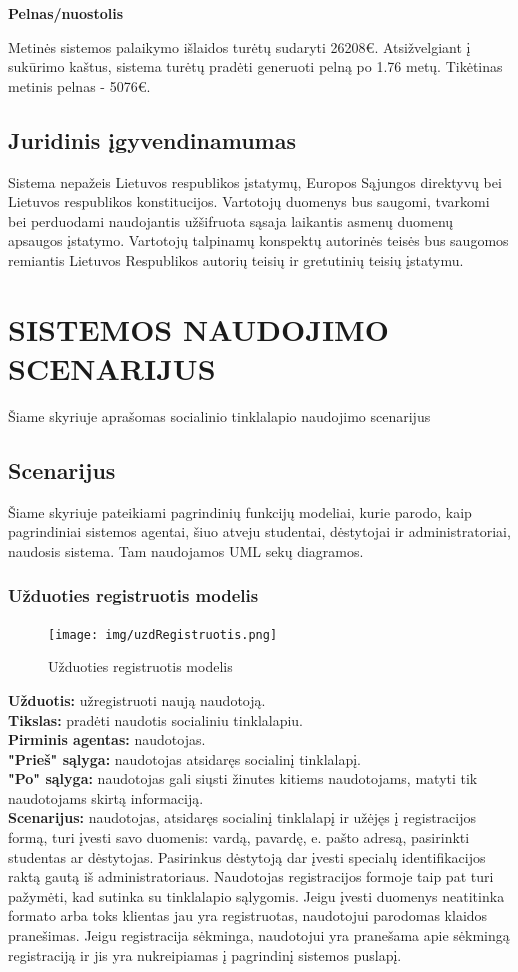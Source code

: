 \documentclass{VUMIFPSkursinis}
\begin{document}
\textbf{Pelnas/nuostolis}

Metinės sistemos palaikymo išlaidos turėtų sudaryti 26208€. Atsižvelgiant į sukūrimo kaštus, sistema turėtų pradėti generuoti pelną po 1.76 metų. Tikėtinas metinis pelnas - 5076€.

\subsection{Juridinis įgyvendinamumas}

 Sistema nepažeis Lietuvos respublikos įstatymų, Europos Sąjungos direktyvų bei Lietuvos respublikos konstitucijos. Vartotojų duomenys bus saugomi, tvarkomi bei perduodami naudojantis užšifruota sąsaja laikantis asmenų duomenų apsaugos įstatymo. Vartotojų talpinamų konspektų autorinės teisės bus saugomos remiantis Lietuvos Respublikos autorių teisių ir gretutinių teisių įstatymu. 

\newpage

\section{SISTEMOS NAUDOJIMO SCENARIJUS}
Šiame skyriuje aprašomas socialinio tinklalapio naudojimo scenarijus
\subsection{Scenarijus}
Šiame skyriuje pateikiami pagrindinių funkcijų modeliai, kurie parodo, kaip pagrindiniai sistemos agentai, šiuo atveju studentai, dėstytojai ir administratoriai, naudosis sistema. Tam naudojamos UML sekų diagramos.
\subsubsection{Užduoties registruotis modelis}
\begin{figure}[H]
\centering
\texttt{[image: img/uzdRegistruotis.png]}
\caption{Užduoties registruotis modelis}
\label{fig:registruotis}
\end{figure}
\textbf{Užduotis: } užregistruoti naują naudotoją.\\
\textbf{Tikslas: } pradėti naudotis socialiniu tinklalapiu.\\
\textbf{Pirminis agentas: } naudotojas.\\
\textbf{"Prieš" sąlyga: } naudotojas atsidaręs socialinį tinklalapį.\\
\textbf{"Po" sąlyga: } naudotojas gali siųsti žinutes kitiems naudotojams, matyti tik naudotojams skirtą informaciją.\\
\textbf{Scenarijus: } naudotojas, atsidaręs socialinį tinklalapį ir užėjęs į registracijos formą, turi įvesti savo duomenis: vardą, pavardę, e. pašto adresą, pasirinkti studentas ar dėstytojas. Pasirinkus dėstytoją dar įvesti specialų identifikacijos raktą gautą iš administratoriaus. Naudotojas registracijos formoje taip pat turi pažymėti, kad sutinka su tinklalapio sąlygomis. Jeigu įvesti duomenys neatitinka formato arba toks klientas jau yra registruotas, naudotojui parodomas klaidos pranešimas. Jeigu registracija sėkminga, naudotojui yra pranešama apie sėkmingą registraciją ir jis yra nukreipiamas į pagrindinį sistemos puslapį.\\
\end{document}
